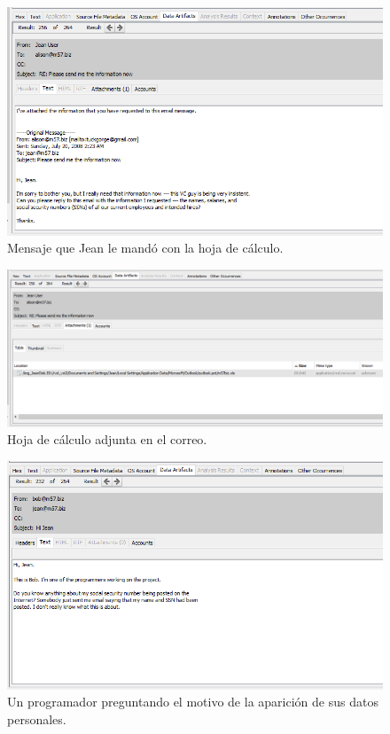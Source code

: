 \documentclass{article}
\begin{document}
\begin{figure}[H]
    \centering
    \includegraphics[width=\textwidth]{imagenes/Windows/Captura de pantalla (13).png}
    \caption{Mensaje que Jean le mandó con la hoja de cálculo.}
\end{figure}

\begin{figure}[H]
    \centering
    \includegraphics[width=\textwidth]{imagenes/Windows/Captura de pantalla (14).png}
    \caption{Hoja de cálculo adjunta en el correo.}
\end{figure}

\begin{figure}[H]
    \centering
    \includegraphics[width=\textwidth]{imagenes/Windows/Captura de pantalla (15).png}
    \caption{Un programador preguntando el motivo de la aparición de sus datos personales.}
\end{figure}
\end{document}
